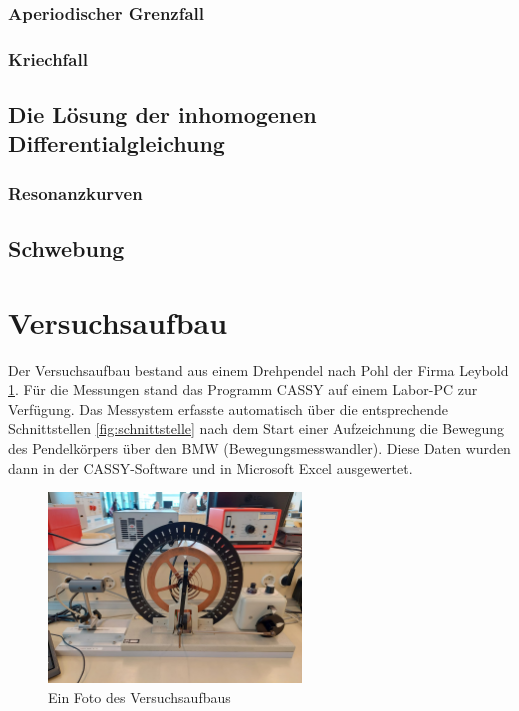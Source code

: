 \documentclass{article}
\begin{document}
\subsubsection{Aperiodischer Grenzfall}
\subsubsection{Kriechfall}
\subsection{Die Lösung der inhomogenen Differentialgleichung}
\subsubsection{Resonanzkurven}
\subsection{Schwebung}
\clearpage

\section{Versuchsaufbau}
Der Versuchsaufbau bestand aus einem Drehpendel nach Pohl der Firma Leybold \ref{fig:versuchsaufbau}.
Für die Messungen stand das Programm CASSY auf einem Labor-PC zur Verfügung.
Das Messystem erfasste automatisch über die entsprechende Schnittstellen \ref{fig:schnittstelle}
nach dem Start einer Aufzeichnung die Bewegung des Pendelkörpers
über den BMW (Bewegungsmesswandler). Diese Daten wurden dann in der CASSY-Software
und in Microsoft Excel ausgewertet.

\begin{figure}[!htb]
    \centering
    \includegraphics[width=0.6\textwidth]{bilder/drehpendel.jpg}
    \caption{Ein Foto des Versuchsaufbaus}
    \label{fig:versuchsaufbau}
\end{figure}
\end{document}
